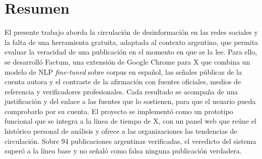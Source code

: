 \chapter*{Resumen}










El presente trabajo aborda la circulación de desinformación en las redes sociales y la falta de una herramienta gratuita, adaptada al contexto argentino, que permita evaluar la veracidad de una publicación en el momento en que se la lee. Para ello, se desarrolló Factum, una extensión de Google Chrome para X que combina un modelo de NLP \textit{fine-tuned} sobre corpus en español, las señales públicas de la cuenta autora y el contraste de la afirmación con fuentes oficiales, medios de referencia y verificadores profesionales. Cada resultado se acompaña de una justificación y del enlace a las fuentes que lo sostienen, para que el usuario pueda comprobarlo por su cuenta. El proyecto se implementó como un prototipo funcional que se integra a la línea de tiempo de X, con un panel web que reúne el histórico personal de análisis y ofrece a las organizaciones las tendencias de circulación. Sobre 94 publicaciones argentinas verificadas, el veredicto del sistema superó a la línea base y no señaló como falsa ninguna publicación verdadera.

